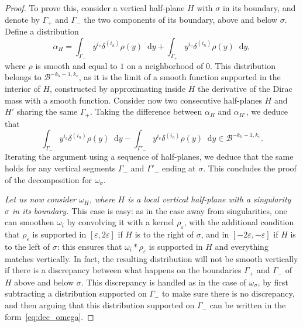 \documentclass[10pt]{amsart}
\newcommand{\boB}{\mathcal{B}}
\newcommand{\dd}{\mathop{}\!\mathrm{d}}
\let\epsilon\varepsilon
\theoremstyle{definition}
\numberwithin{equation}{section}
\begin{document}
\begin{proof}
To prove this, consider a vertical half-plane $H$ with $\sigma$ in its
boundary, and denote by $\Gamma_+$ and $\Gamma_-$ the two components of its
boundary, above and below $\sigma$. Define a distribution
\[
\alpha_H =
\int_{\Gamma_-} y^{i_v} \delta^{(i_h)} \rho(y) \dd y + \int_{\Gamma_+}
y^{i_v} \delta^{(i_h)} \rho(y) \dd y,
\]
where $\rho$ is smooth and equal to $1$
on a neighborhood of $0$. This distribution belongs to $\boB^{-k_h-1, k_v}$,
as it is the limit of a smooth function supported in the interior of $H$,
constructed by approximating inside $H$ the derivative of the Dirac mass with
a smooth function. Consider now two consecutive half-planes $H$ and $H'$
sharing the same $\Gamma_+$. Taking the difference between $\alpha_H$ and
$\alpha_{H'}$, we deduce that
\begin{equation*}
\int_{\Gamma_-} y^{i_v} \delta^{(i_h)} \rho(y) \dd y
- \int_{\Gamma'_-} y^{i_v} \delta^{(i_h)} \rho(y) \dd y
\in \boB^{-k_h-1, k_v}.
\end{equation*}
Iterating the argument using a sequence of half-planes, we deduce that the
same holds for any vertical segments $\Gamma_-$ and $\Gamma'_-$ ending at
$\sigma$. This concludes the proof of the decomposition for $\omega_\sigma$.

\emph{Let us now consider $\omega_H$, where $H$ is a local vertical half-plane
with a singularity~$\sigma$ in its boundary.} This case is easy: as in the
case away from singularities, one can smoothen $\omega_i$ by convolving it
with a kernel $\rho_\epsilon$, with the additional condition that
$\rho_\epsilon$ is supported in $[\epsilon,2\epsilon]$ if $H$ is to the right
of $\sigma$, and in $[-2\epsilon, -\epsilon]$ if $H$ is to the left of
$\sigma$: this ensures that $\omega_i * \rho_\epsilon$ is supported in $H$
and everything matches vertically. In fact, the resulting distribution will
not be smooth vertically if there is a discrepancy between what happens on
the boundaries $\Gamma_+$ and $\Gamma_-$ of $H$ above and below $\sigma$.
This discrepancy is handled as in the case of $\omega_\sigma$, by first
subtracting a distribution supported on $\Gamma_-$ to make sure there is no
discrepancy, and then arguing that this distribution supported on $\Gamma_-$
can be written in the form~\eqref{eq:dec_omega}.


\end{proof}
\end{document}
